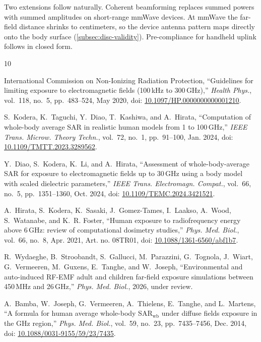 \documentclass[journal,twocolumn,10pt]{IEEEtran}
\newcommand*{\doi}[1]{\href{https://doi.org/#1}{#1}}
\theoremstyle{plain}
\begin{document}
Two extensions follow naturally. Coherent beamforming replaces
summed powers with summed amplitudes on short-range mmWave devices.
At mmWave the far-field distance shrinks to centimeters, so the
device antenna pattern maps directly onto the body surface
(\cref{subsec:disc-validity}). Pre-compliance for handheld uplink
follows in closed form.

\begin{thebibliography}{10}
\providecommand{\url}[1]{#1}

International Commission on Non-Ionizing Radiation Protection,
  ``Guidelines for limiting exposure to electromagnetic fields
  (100\,kHz to 300\,GHz),'' \emph{Health Phys.}, vol.~118, no.~5,
  pp.~483--524, May 2020, doi: \doi{10.1097/HP.0000000000001210}.

S.~Kodera, K.~Taguchi, Y.~Diao, T.~Kashiwa, and A.~Hirata,
  ``Computation of whole-body average SAR in realistic human models from
  1 to 100\,GHz,'' \emph{IEEE Trans. Microw. Theory Techn.}, vol.~72,
  no.~1, pp.~91--100, Jan. 2024, doi: \doi{10.1109/TMTT.2023.3289562}.

Y.~Diao, S.~Kodera, K.~Li, and A.~Hirata, ``Assessment of
  whole-body-average SAR for exposure to electromagnetic fields up to
  30\,GHz using a body model with scaled dielectric parameters,''
  \emph{IEEE Trans. Electromagn. Compat.}, vol.~66, no.~5,
  pp.~1351--1360, Oct. 2024, doi: \doi{10.1109/TEMC.2024.3421521}.

A.~Hirata, S.~Kodera, K.~Sasaki, J.~Gomez-Tames, I.~Laakso, A.~Wood,
  S.~Watanabe, and K.~R. Foster, ``Human exposure to radiofrequency
  energy above 6\,GHz: review of computational dosimetry studies,''
  \emph{Phys. Med. Biol.}, vol.~66, no.~8, Apr. 2021, Art. no. 08TR01,
  doi: \doi{10.1088/1361-6560/abf1b7}.

R.~Wydaeghe, B.~Stroobandt, S.~Gallucci, M.~Parazzini, G.~Tognola,
  J.~Wiart, G.~Vermeeren, M.~Guxens, E.~Tanghe, and W.~Joseph,
  ``Environmental and auto-induced RF-EMF adult and children far-field
  exposure simulations between 450\,MHz and 26\,GHz,''
  \emph{Phys. Med. Biol.}, 2026, under review.

A.~Bamba, W.~Joseph, G.~Vermeeren, A.~Thielens, E.~Tanghe, and L.~Martens,
  ``A formula for human average whole-body SAR$_{\mathrm{wb}}$ under diffuse
  fields exposure in the GHz region,'' \emph{Phys. Med. Biol.}, vol.~59,
  no.~23, pp.~7435--7456, Dec. 2014, doi: \doi{10.1088/0031-9155/59/23/7435}.


\end{thebibliography}
\end{document}
